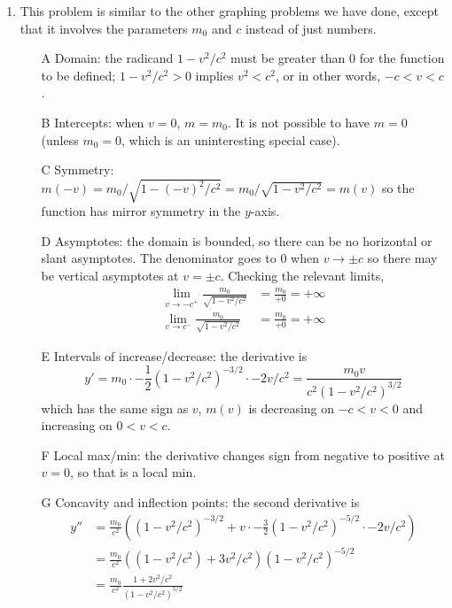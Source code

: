 \documentclass{article}
\begin{document}
\begin{enumerate}
\begin{figure}[htbp]
    \label{fig:x-2all3overx+2all2}
  \end{figure}
\item %
  This problem is similar to the other graphing problems we have done,
  except that it involves the parameters $m_0$ and $c$ instead of just
  numbers.
  \begin{itemize}
  \item[A] Domain: the radicand $1-v^2/c^2$ must be greater than $0$
    for the function to be defined; $1-v^2/c^2>0$ implies $v^2<c^2$,
    or in other words, $-c<v<c$.
  \item[B] Intercepts: when $v=0$, $m=m_0$.  It is not possible to
    have $m=0$ (unless $m_0=0$, which is an uninteresting special
    case).
  \item[C] Symmetry:
    $m(-v)=m_0/\sqrt{1-(-v)^2/c^2}=m_0/\sqrt{1-v^2/c^2}=m(v)$ so the
    function has mirror symmetry in the $y$-axis.
  \item[D] Asymptotes: the domain is bounded, so there can be no
    horizontal or slant asymptotes.  The denominator goes to $0$ when
    $v\to\pm c$ so there may be vertical asymptotes at $v=\pm c$.
    Checking the relevant limits,
    \begin{align*}
      \lim_{v\to -c^+} \frac{m_0}{\sqrt{1-v^2/c^2}} &= \frac{m_0}{+0} = +\infty
      \\
      \lim_{v\to c^-} \frac{m_0}{\sqrt{1-v^2/c^2}} &= \frac{m_0}{+0} = +\infty
    \end{align*}
  \item[E] Intervals of increase/decrease: the derivative is
    \begin{displaymath}
      y'=m_0\cdot -\frac{1}{2} (1-v^2/c^2)^{-3/2} \cdot -2v/c^2
      = \frac{m_0v}{c^2(1-v^2/c^2)^{3/2}}
    \end{displaymath}
    which has the same sign as $v$, $m(v)$ is decreasing on $-c<v<0$
    and increasing on $0<v<c$.
  \item[F] Local max/min: the derivative changes sign from negative to
    positive at $v=0$, so that is a local min.
  \item[G] Concavity and inflection points: the second derivative is
    \begin{align*}
      y''&=\frac{m_0}{c^2} \left( (1-v^2/c^2)^{-3/2} + v \cdot -\frac{3}{2}
        (1-v^2/c^2)^{-5/2} \cdot -2v/c^2 \right) \\
      &= \frac{m_0}{c^2} \left( (1-v^2/c^2) + 3 v^2/c^2 \right)
      (1-v^2/c^2)^{-5/2} \\
      &=\frac{m_0}{c^2} \frac{1+2v^2/c^2}{(1-v^2/c^2)^{5/2}}

\end{align*}
\end{itemize}
\end{enumerate}
\end{document}
